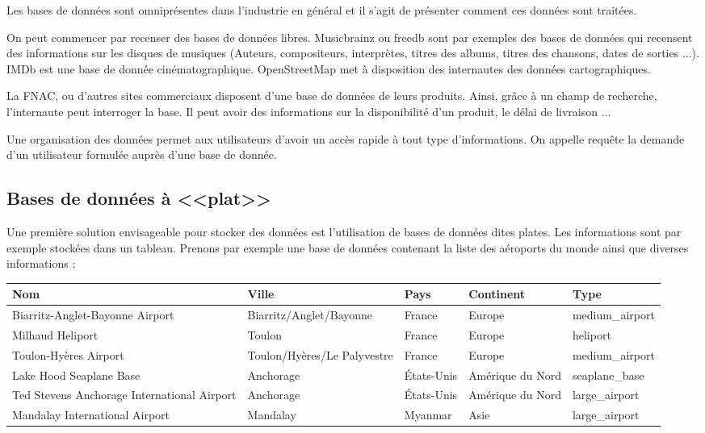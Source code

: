 \documentclass[10pt]{article}
\begin{document}
Les bases de données sont omniprésentes dans l'industrie en général et il s'agit de présenter comment ces données sont traitées. 

On peut commencer par recenser des bases de données libres. Musicbrainz ou freedb sont par exemples des bases de données qui recensent des informations sur les disques de musiques (Auteurs, compositeurs, interprètes, titres des albums, titres des chansons, dates de sorties ...). IMDb est une base de donnée cinématographique. OpenStreetMap met à disposition des internautes des données cartographiques. 

La FNAC, ou d'autres sites commerciaux disposent d'une base de données de leurs produits. Ainsi, grâce à un champ de recherche, l'internaute peut interroger la base. Il peut avoir des informations sur la disponibilité d'un produit, le délai de livraison ...

Une organisation des données permet aux utilisateurs d'avoir un accès rapide à tout type d'informations. On appelle requête la demande d'un utilisateur formulée auprès d'une base de donnée. 

\subsection{Bases de données à <<plat>>}
Une première solution envisageable pour stocker des données est l'utilisation de bases de données dites plates. Les informations sont par exemple stockées dans un tableau. Prenons par exemple une base de données contenant la liste des aéroports du monde ainsi que diverses informations : 
\begin{center}
\begin{tabular}{p{4cm}llll}
\hline
Nom & Ville & Pays & Continent  & Type \\
\hline
\hline
Biarritz-Anglet-Bayonne Airport & Biarritz/Anglet/Bayonne & France & Europe & medium\_airport \\
Milhaud Heliport & Toulon & France & Europe & heliport \\
Toulon-Hyères Airport & Toulon/Hyères/Le Palyvestre & France & Europe & medium\_airport \\
Lake Hood Seaplane Base & Anchorage & États-Unis & Amérique du Nord & seaplane\_base\\
Ted Stevens Anchorage International Airport & Anchorage & États-Unis & Amérique du Nord & large\_airport\\
Mandalay International Airport & Mandalay & Myanmar & Asie & large\_airport\\
\hline
\end{tabular}
\end{center}
\end{document}

